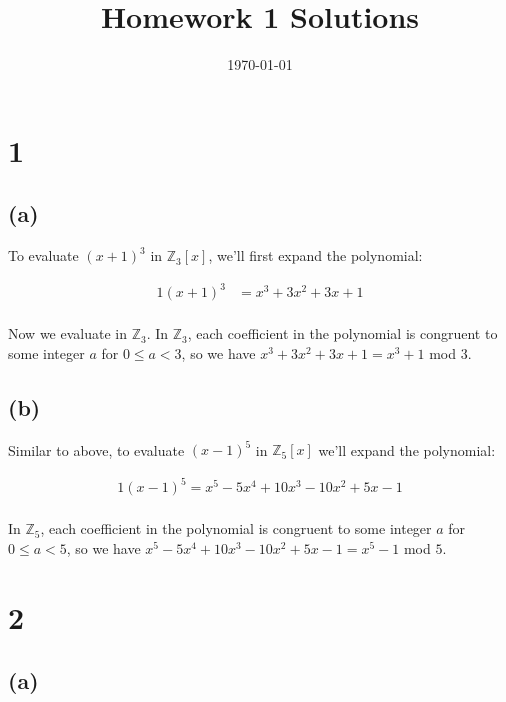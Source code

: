 \documentclass{article}
\title{\textbf{Homework 1 Solutions}}
\date{}
\date\today
\begin{document}
\maketitle %

\thispagestyle{firstpage}
\section*{1}

\subsection*{(a)}

To evaluate $(x+1)^3$ in $\mathbb{Z}_3 [x]$, we'll first expand the polynomial:

\begin{alignat*}{1}
    (x+1)^3 &= x^3 + 3x^2 + 3x + 1 \\ 
\end{alignat*}

Now we evaluate in $\mathbb{Z}_3$.  In $\mathbb{Z}_3$, each coefficient in the 
polynomial is congruent to some integer $a$ for $0 \leq a < 3$, so we have 
$x^3 + 3x^2 + 3x + 1 = x^3 + 1$ mod $3$.


\subsection*{(b)}

Similar to above, to evaluate $(x-1)^5$ in $\mathbb{Z}_5 [x]$ we'll expand the 
polynomial: 

\begin{alignat*}{1}
    (x-1)^5 = x^5 - 5x^4 + 10x^3 - 10x^2 + 5x -1 \\ 
\end{alignat*}

In $\mathbb{Z}_5$, each coefficient in the polynomial is congruent to some integer 
$a$ for $0 \leq a < 5$, so we have $x^5 - 5x^4 + 10x^3 - 10x^2 + 5x -1 = x^5 - 1$ mod $5$.

\section*{2}

\subsection*{(a)} 
\end{document}
